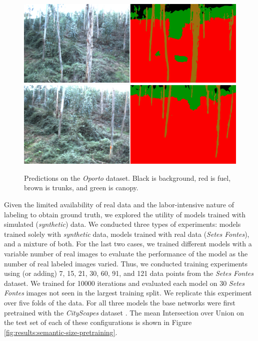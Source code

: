 \begin{figure}
   \centering
    \includegraphics[width=\linewidth]{figs/results/semantic_segmentation/SeteFontes/qualatative_001400.png}  
    \includegraphics[width=\linewidth]{figs/results/semantic_segmentation/SeteFontes/qualatative_001600.png}  
    \caption{Predictions on the \textit{Oporto} dataset. Black is background, red is fuel, brown is trunks, and green is canopy.
    } 
    \label{fig:results:oporto_semantic_seg_qual}
\end{figure}

Given the limited availability of real data and the labor-intensive nature of labeling to obtain ground truth, we explored the utility of models trained with simulated (\textit{synthetic}) data. We conducted three types of experiments: models trained solely with \textit{synthetic} data, models trained with real data (\textit{Setes Fontes}), and a mixture of both. For the last two cases, we trained different models with a variable number of real images to evaluate the performance of the model as the number of real labeled images varied. Thus, we conducted training experiments using (or adding) 7, 15, 21, 30, 60, 91, and 121 data points from the \textit{Setes Fontes} dataset. We trained for 10000 iterations and evaluated each model on 30 \textit{Setes Fontes} images not seen in the largest training split. We replicate this experiment over five folds of the data. For all three models the base networks were first pretrained with the \textit{CityScapes} dataset \cite{Cordts2016}. The mean Intersection over Union on the test set of each of these configurations is shown in Figure \ref{fig:results:semantic-size-pretraining}.

